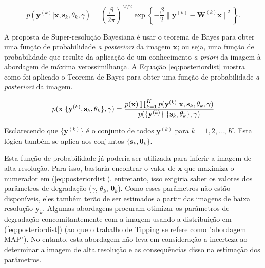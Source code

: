 \begin{equation}
	\label{eq:likelihood0}
	p(\mathbf{y}^{(k)} | \mathbf{x}, \mathbf{s}_k, \theta_k, \gamma) = 
	\left(\frac{\beta}{2\pi}\right)^{M/2}
	\exp \left\{ -\frac{\beta}{2} \| \mathbf{y}^{(k)} - \mathbf{W}^{(k)} \mathbf{x} \|^2 \right\}.
\end{equation}


A proposta de Super-resolução Bayesiana é usar o teorema de Bayes para obter uma função
de probabilidade \emph{a posteriori} da imagem $\mathbf{x}$; ou seja, uma função de
probabilidade que resulte da aplicação de um conhecimento \emph{a priori} da imagem à
abordagem de máxima verossimilhança. A Equação \ref{eq:posteriordist} mostra como foi aplicado o Teorema de Bayes para obter uma função de probabilidade \emph{a posteriori} da imagem.

\begin{equation}
	\label{eq:posteriordist}
	p(\mathbf{x}|\{\mathbf{y}^{(k)},\mathbf{s}_k,\theta_k\}, \gamma) = 
	\frac{p(\mathbf{x})\prod^K_{k=1} p(\mathbf{y}^{(k)}|\mathbf{x},\mathbf{s}_k,\theta_k, \gamma)}
	{p(\{\mathbf{y}^{(k)}\}|\{\mathbf{s}_k,\mathbf{\theta}_k\},\gamma)} \\
\end{equation}


Esclarecendo que $\{\mathbf{y}^{(k)}\}$ é o conjunto de todos $\mathbf{y}^{(k)}$ para $k = 1,2,...,K$.
Esta lógica também se aplica aos conjuntos $\{\mathbf{s}_k,\mathbf{\theta}_k\}$.

Esta função de probabilidade já poderia ser utilizada para inferir a imagem de alta resolução.
Para isso, bastaria encontrar o valor de $\mathbf{x}$ que maximiza o numerador em (\ref{eq:posteriordist}). entretanto, isso exigiria saber os valores dos parâmetros de degradação ($\gamma$, $\theta_k$, $\mathbf{\theta}_k$).
Como esses parâmetros não estão disponíveis, eles também terão de ser estimados a partir das imagens de baixa resolução $\mathbf{y}_k$. 
Algumas abordagens procuram otimizar os parâmetros de degradação concomitantemente com a imagem usando a distribuição em (\ref{eq:posteriordist}) (ao que o trabalho de Tipping \cite{tipping2003bayesian} se refere como "abordagem MAP"). No entanto, esta abordagem não leva em consideração a incerteza ao determinar a imagem de alta resolução e as consequências disso na estimação dos parâmetros.

